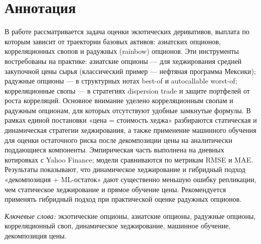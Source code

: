 \chapter*{Аннотация}

В работе рассматривается задача оценки экзотических
 деривативов, выплата по которым зависит от траектории
  базовых активов: азиатских опционов, 
  корреляционных свопов и радужных (rainbow) опционов.
   Эти инструменты востребованы на практике: азиатские
    опционы — для хеджирования средней закупочной цены 
    сырья (классический пример — нефтяная программа Мексики);
     радужные опционы — в структурных нотах best-of и 
     autocallable worst-of; корреляционные свопы — 
     в стратегиях dispersion trade и защите портфелей 
     от роста корреляций. Основное внимание уделено 
     корреляционным свопам и радужным опционам, для которых 
     отсутствуют удобные замкнутые формулы. В рамках единой 
     постановки «цена = стоимость хеджа» разбираются 
     статическая и динамическая стратегии хеджирования, 
     а также применение машинного обучения для оценки 
     остаточного риска после декомпозиции цены на
      аналитически поддающиеся компоненты. Эмпирическая часть 
      выполнена на дневных котировках с Yahoo Finance;
       модели сравниваются по метрикам RMSE и MAE. 
       Результаты показывают, что динамическое 
       хеджирование и гибридный подход «декомпозиция +
        ML-остаток» дают существенно меньшую ошибку репликации,
         чем статическое хеджирование и прямое обучение цены.
          Рекомендуется применять гибридный подход при 
          практической оценке радужных опционов.

\par\medskip
\noindent\textit{Ключевые слова:} экзотические опционы, азиатские опционы,
радужные опционы, корреляционный своп, динамическое хеджирование,
машинное обучение, декомпозиция цены.

\vspace{1.2cm}

